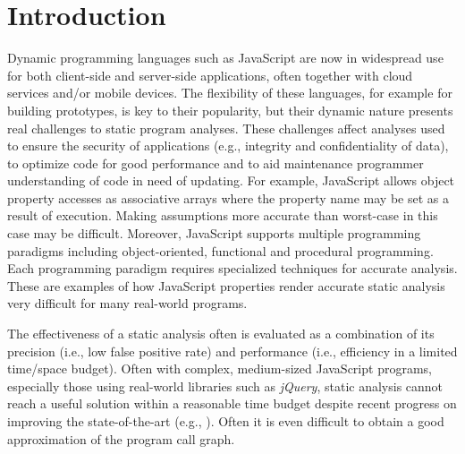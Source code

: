 \section{Introduction}
\label{intro}

Dynamic programming languages such as JavaScript are now in widespread 
use for both client-side and server-side applications, often together with 
cloud services and/or mobile devices.  The flexibility of these languages,
for example for building prototypes, is key to their popularity, but their
dynamic nature presents real challenges to static program analyses.  These challenges
affect analyses used to ensure the security of applications 
(e.g., integrity and confidentiality of data), to optimize code for 
good performance and to aid maintenance programmer understanding of 
code in need of updating. For example, JavaScript allows object property accesses as associative arrays
where the property name may be set as a result of execution. Making assumptions more accurate than worst-case in this case may be difficult. Moreover, JavaScript supports multiple programming paradigms including object-oriented, functional and procedural programming. Each programming paradigm requires specialized techniques for accurate analysis. These are 
examples of how JavaScript properties render accurate static analysis 
very difficult for many real-world programs.

\begin{comment}
JavaScript allows program constructs 
to generate code at runtime and then execute this code (i.e., effectively dynamic 
program construction), which must be considered by a sound static analysis. 
Making assumptions more accurate than worst-case in these
circumstances may be difficult. 
Moreover, JavaScript supports object property accesses as associative arrays
where the property name may be set as a result of execution. In this case too,
analysis accuracy requires better than worst-case approximation.  These are 
examples of how JavaScript properties render accurate static analysis 
very difficult for many real-world programs.
\end{comment}

The effectiveness of a static analysis often is evaluated
as a combination of its precision (i.e., low false positive rate)
and performance (i.e., efficiency in a limited time/space budget). 
Often with complex, medium-sized JavaScript programs, especially those 
using real-world libraries such as {\it jQuery}, static analysis cannot 
reach a useful solution within a reasonable time budget despite recent progress 
on improving the state-of-the-art (e.g., \cite{Sridharan:2012:CTP:2367163.2367191, Andreasen:2014:DSA:2660193.2660214, DBLP:conf/ecoop/WeiR15, DBLP:conf/ecoop/ParkR15}). 
Often it is even difficult to obtain a good approximation of the program 
call graph. 

